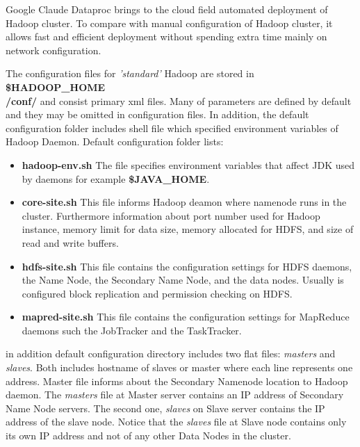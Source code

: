 \documentclass[a4paper,12pt,oneside]{report}
\begin{document}
Google Claude Dataproc brings to the cloud field automated deployment of Hadoop cluster. To compare 
with manual configuration of Hadoop cluster, it allows fast and efficient deployment without spending 
extra time mainly on network configuration.

The configuration files for \textit{'standard'} Hadoop are stored in \textbf{\$HADOOP\_HOME\\/conf/} 
and consist  primary xml files. Many of parameters are defined by default and they may be omitted in configuration files. In addition, the default 
configuration folder  includes shell file which specified environment variables of Hadoop Daemon. Default configuration folder lists:
\begin{itemize}\label{conf_files}
\item \textbf{hadoop-env.sh} The file specifies environment variables that affect JDK used by daemons
for example \textbf{\$JAVA\_HOME}.
\item \textbf{core-site.sh}   This file informs Hadoop deamon where namenode runs in the cluster. Furthermore 
information about port number used for Hadoop instance, memory limit for data size,  memory allocated for HDFS, and size of read and write buffers.
\item \textbf{hdfs-site.sh}  This file contains the configuration settings for HDFS daemons, the Name 
Node, the Secondary Name Node, and the data nodes. Usually is configured block replication and permission checking on HDFS. 
\item \textbf{mapred-site.sh}  This file contains the configuration settings for MapReduce daemons 
such the JobTracker and the TaskTracker.
\end{itemize}

in addition default configuration directory includes two flat files: \textit{masters} and \textit{slaves}. 
Both includes hostname of slaves or master where each line represents one address. 
Master file informs about the Secondary Namenode location to Hadoop daemon. The \textit{masters} 
file at Master server contains an IP address of Secondary Name Node servers.
The second one, \textit{slaves} on Slave server contains the IP address of the slave node. Notice 
that the \textit{slaves} file at Slave node contains only its own IP address and not of any other Data Nodes in the cluster.
\end{document}
